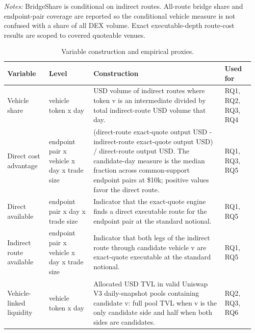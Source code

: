 \documentclass[12pt]{article}
\begin{document}
\begin{landscape}
\begin{table}[!htbp]
\begin{threeparttable}
\begin{tabular}
\bottomrule
\end{tabular}
\begin{tablenotes}[flushleft]
\footnotesize
\item \textit{Notes:} BridgeShare is conditional on indirect routes. All-route bridge share and endpoint-pair coverage are reported so the conditional vehicle measure is not confused with a share of all DEX volume. Exact executable-depth route-cost results are scoped to covered quoteable venues.
\end{tablenotes}
\end{threeparttable}
\end{table}
\end{landscape}

\begin{landscape}
\begin{table}[!htbp]
\centering
\scriptsize
\setlength{\tabcolsep}{2.5pt}
\begin{threeparttable}
\caption{Variable construction and empirical proxies.}
\label{tab:variables}
\begin{tabular}{@{}>{\raggedright\arraybackslash}p{}>{\raggedright\arraybackslash}p{}>{\raggedright\arraybackslash}p{}>{\raggedright\arraybackslash}p{}@{}}
\toprule
Variable & Level & Construction & Used for \\
\midrule
Vehicle share & vehicle token x day & USD volume of indirect routes where token v is an intermediate divided by total indirect-route USD volume that day. & RQ1, RQ2, RQ3, RQ4 \\
Direct cost advantage & endpoint pair x vehicle x day x trade size & (direct-route exact-quote output USD - indirect-route exact-quote output USD) / direct-route output USD. The candidate-day measure is the median fraction across common-support endpoint pairs at \$10k; positive values favor the direct route. & RQ1, RQ3, RQ5 \\
Direct available & endpoint pair x day x trade size & Indicator that the exact-quote engine finds a direct executable route for the endpoint pair at the standard notional. & RQ1, RQ5 \\
Indirect route available & endpoint pair x vehicle x day x trade size & Indicator that both legs of the indirect route through candidate vehicle v are exact-quote executable at the standard notional. & RQ1, RQ5 \\
Vehicle-linked liquidity & vehicle token x day & Allocated USD TVL in valid Uniswap V3 daily-snapshot pools containing candidate v: full pool TVL when v is the only candidate side and half when both sides are candidates. & RQ2, RQ3, RQ6 \\

\end{tabular}
\end{threeparttable}
\end{table}
\end{landscape}
\end{document}
